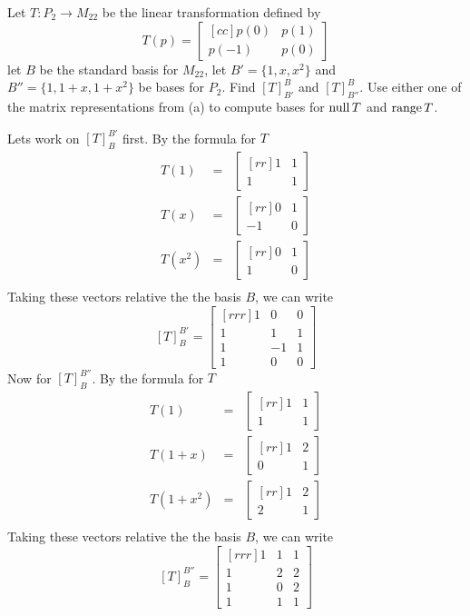 \ii Let $T:P_2 \rightarrow M_{22}$ be the linear transformation defined by
$$
T(p) =
\begin{bmatrix}[cc]
p(0)&p(1)\\
p(-1)&p(0)
\end{bmatrix}
$$
let $B$ be the standard basis for $M_{22}$, let $B'=\{1,x,x^2\}$ and $B''=\{1,1+x,1+x^2\}$ be bases for $P_2$. 
\bb
\ii Find $[T]_{B'}^{B}$ and $[T]_{B''}^{B}$.
\ii Use either one of the matrix representations from (a) to compute bases for $\operatorname{null} T$ and $\operatorname{range} T$. 
\ee
\begin{solution}
\noindent Lets work on $[T]_{B}^{B'}$ first. By the formula for $T$
\begin{eqnarray*}
T(1) &=&
\begin{bmatrix}[rr]
1&1\\
1&1
\end{bmatrix}\\
T(x) &=&
\begin{bmatrix}[rr]
0&1\\
-1&0
\end{bmatrix}\\
T(x^2) &=&
\begin{bmatrix}[rr]
0&1\\
1&0
\end{bmatrix}\\
\end{eqnarray*}
Taking these vectors relative the the basis $B$, we can write
$$
[T]_{B}^{B'} =
\begin{bmatrix}[rrr]
1&0&0\\
1&1&1\\
1&-1&1\\
1&0&0
\end{bmatrix}
$$
Now for $[T]_{B}^{B''}$. By the formula for $T$
\begin{eqnarray*}
T(1) &=&
\begin{bmatrix}[rr]
1&1\\
1&1
\end{bmatrix}\\
T(1+x) &=&
\begin{bmatrix}[rr]
1&2\\
0&1
\end{bmatrix}\\
T(1+x^2) &=&
\begin{bmatrix}[rr]
1&2\\
2&1
\end{bmatrix}\\
\end{eqnarray*}
Taking these vectors relative the the basis $B$, we can write
$$
[T]_{B}^{B''} =
\begin{bmatrix}[rrr]
1&1&1\\
1&2&2\\
1&0&2\\
1&1&1
\end{bmatrix}
$$
\end{solution}
